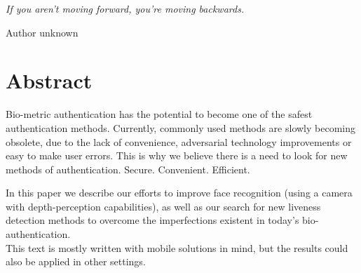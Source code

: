 \begin{flushright}
    \textit{If you aren't moving forward, you're moving backwards.}

    Author unknown %
\end{flushright}


\section*{Abstract}
Bio-metric authentication has the potential to become
one of the safest authentication methods.
Currently, commonly used methods are slowly becoming obsolete,
due to the lack of convenience, adversarial technology
improvements or easy to make user errors.
This is why we believe there is a need to look for
new methods of authentication. Secure. Convenient. Efficient.\par
\bigskip


In this paper we describe our efforts to improve face recognition
(using a camera with depth-perception capabilities), as well as
our search for new liveness detection methods to overcome
the imperfections existent in today's bio-authentication.\\
This text is mostly written with mobile solutions in mind,
but the results could also be applied in other settings.
